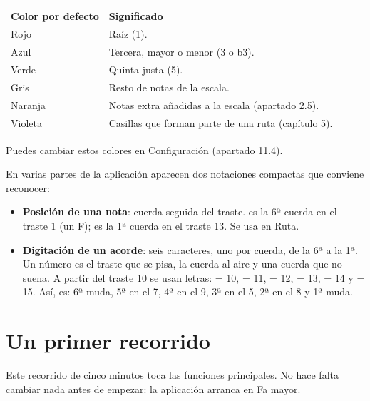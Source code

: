 \documentclass[a4paper,11pt,oneside]{report}
\newcounter{none}
\providecommand{\tightlist}{\setlength{\itemsep}{2pt}\setlength{\parskip}{0pt}}
\let\originaltexttt\texttt
\renewcommand{\texttt}[1]{\originaltexttt{\seqsplit{#1}}}
\begin{document}
{\def\LTcaptype{none} %
\begin{longtable}[]{@{}>{\raggedright\arraybackslash}p{}>{\raggedright\arraybackslash}p{}@{}}
\toprule\noalign{}
Color por defecto & Significado \\
\midrule\noalign{}
\endhead
\bottomrule\noalign{}
\endlastfoot
Rojo & Raíz (1). \\
Azul & Tercera, mayor o menor (3 o b3). \\
Verde & Quinta justa (5). \\
Gris & Resto de notas de la escala. \\
Naranja & Notas extra añadidas a la escala (apartado 2.5). \\
Violeta & Casillas que forman parte de una ruta (capítulo 5). \\
\end{longtable}
}

Puedes cambiar estos colores en Configuración (apartado 11.4).

En varias partes de la aplicación aparecen dos notaciones compactas que conviene reconocer:

\begin{itemize}
\tightlist
\item
  \textbf{Posición de una nota}: cuerda seguida del traste. \texttt{61} es la 6ª cuerda en el traste 1 (un F); \texttt{113} es la 1ª cuerda en el traste 13. Se usa en Ruta.
\item
  \textbf{Digitación de un acorde}: seis caracteres, uno por cuerda, de la 6ª a la 1ª. Un número es el traste que se pisa, \texttt{0} la cuerda al aire y \texttt{x} una cuerda que no suena. A partir del traste 10 se usan letras: \texttt{a} = 10, \texttt{b} = 11, \texttt{c} = 12, \texttt{d} = 13, \texttt{e} = 14 y \texttt{f} = 15. Así, \texttt{x7958x} es: 6ª muda, 5ª en el 7, 4ª en el 9, 3ª en el 5, 2ª en el 8 y 1ª muda.
\end{itemize}

\Needspace{3.5cm}
\section{Un primer recorrido}\label{un-primer-recorrido}

Este recorrido de cinco minutos toca las funciones principales. No hace falta cambiar nada antes de empezar: la aplicación arranca en Fa mayor.
\end{document}
